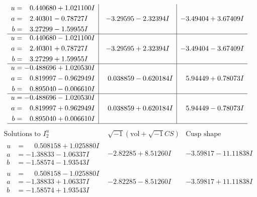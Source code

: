 \documentclass[1p]{elsarticle_modified}
\theoremstyle{definition}
\newcommand{\I}{\sqrt{-1}}
\begin{document}
$$\begin{array}{c|c|c}
\begin{aligned}
u &= \phantom{-}0.440680 + 1.021100 I \\
a &= \phantom{-}2.40301 - 0.78727 I \\
b &= \phantom{-}3.27299 - 1.59955 I\end{aligned}
 & -3.29595 - 2.32394 I & -3.49404 + 3.67409 I \\ \hline\begin{aligned}
u &= \phantom{-}0.440680 - 1.021100 I \\
a &= \phantom{-}2.40301 + 0.78727 I \\
b &= \phantom{-}3.27299 + 1.59955 I\end{aligned}
 & -3.29595 + 2.32394 I & -3.49404 - 3.67409 I \\ \hline\begin{aligned}
u &= -0.488696 + 1.020530 I \\
a &= \phantom{-}0.819997 - 0.962949 I \\
b &= \phantom{-}0.895040 - 0.006610 I\end{aligned}
 & \phantom{-}0.038859 - 0.620184 I & \phantom{-}5.94449 + 0.78073 I \\ \hline\begin{aligned}
u &= -0.488696 - 1.020530 I \\
a &= \phantom{-}0.819997 + 0.962949 I \\
b &= \phantom{-}0.895040 + 0.006610 I\end{aligned}
 & \phantom{-}0.038859 + 0.620184 I & \phantom{-}5.94449 - 0.78073 I\\
 \hline 
 \end{array}$$\newpage$$\begin{array}{c|c|c}  
\text{Solutions to }I^u_{2}& \I (\text{vol} + \sqrt{-1}CS) & \text{Cusp shape}\\
 \hline 
\begin{aligned}
u &= \phantom{-}0.508158 + 1.025880 I \\
a &= -1.38833 - 1.06337 I \\
b &= -1.58574 - 1.93543 I\end{aligned}
 & -2.82285 + 8.51260 I & -3.59817 - 11.11838 I \\ \hline\begin{aligned}
u &= \phantom{-}0.508158 - 1.025880 I \\
a &= -1.38833 + 1.06337 I \\
b &= -1.58574 + 1.93543 I\end{aligned}
 & -2.82285 - 8.51260 I & -3.59817 + 11.11838 I \\ \hline\begin{aligned}

\end{aligned}
\end{array}$$
\end{document}

